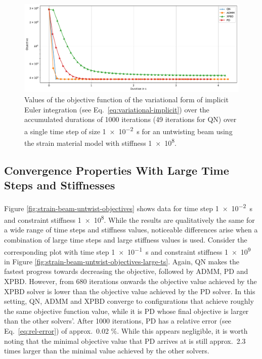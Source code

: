 \begin{figure}[h]
    \includegraphics[width=\textwidth]{figures/strain_beam_untwist_objectives_time.pdf}
    \caption{Values of the objective function of the variational form of implicit Euler integration (see Eq.\ \ref{eq:variational-implicit}) over the accumulated durations of 
        1000 iterations (49 iterations for QN) over a single time step of size \SI{1e-2}{\second} for an untwisting beam using the strain material model with stiffness \num{1e8}.}
    \label{fig:strain-beam-untwist-objectives-time}
\end{figure}

\subsection{Convergence Properties With Large Time Steps and Stiffnesses}\label{ss:untwisting-beam-strain-convergence-large-ts}
Figure \ref{fig:strain-beam-untwist-objectives} shows data for time step \SI{1e-2}{\second} and constraint stiffness \num{1e8}. While the results are qualitatively 
the same for a wide range of time steps and stiffness values, noticeable differences arise when a combination of large time steps and large stiffness values is used.
Consider the corresponding plot with time step \SI{1e-1}{\second} and constraint stiffness \num{1e9} in Figure \ref{fig:strain-beam-untwist-objectives-large-ts}. Again,
QN makes the fastest progress towards decreasing the objective, followed by ADMM, PD and XPBD. However, from 680 iterations onwards the objective value achieved by the XPBD 
solver is lower than the objective value achieved by the PD solver. In this setting, QN, ADMM and XPBD converge to configurations that achieve roughly the same objective 
function value, while it is PD whose final objective is larger than the other solvers'. After 1000 iterations, PD has a relative error (see Eq.\ \ref{eq:rel-error}) 
of approx.\ 0.02 \%. While this appears negligible, it is worth noting that the minimal objective value that PD arrives at is still approx.\ 2.3 
times larger than the minimal value achieved by the other solvers.

